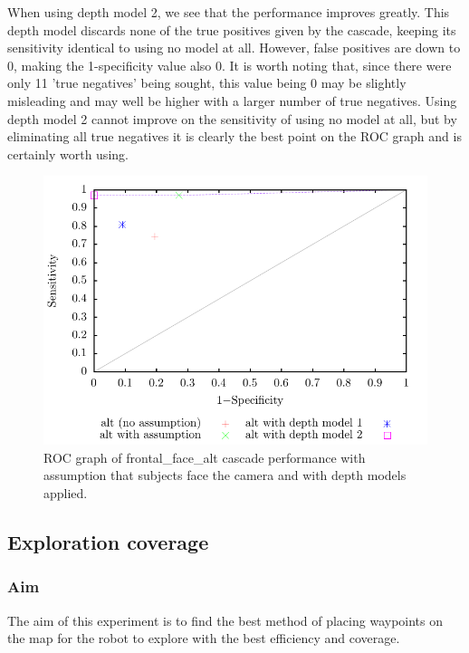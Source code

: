\documentclass[conference]{IEEEtran}
\begin{document}
When using depth model 2, we see that the performance improves greatly. This depth model discards none of the true positives given by the cascade, keeping its sensitivity identical to using no model at all. However, false positives are down to 0, making the 1-specificity value also 0. It is worth noting that, since there were only 11 'true negatives' being sought, this value being 0 may be slightly misleading and may well be higher with a larger number of true negatives. Using depth model 2 cannot improve on the sensitivity of using no model at all, but by eliminating all true negatives it is clearly the best point on the ROC graph and is certainly worth using.

\begin{figure}
  \includegraphics[width=\columnwidth]{kinect_ROC}
  \caption{ROC graph of frontal\_face\_alt cascade performance with assumption that subjects face the camera and with depth models applied.}
  \label{fig:cascade_with_model}
\end{figure}
\subsection{Exploration coverage}
\subsubsection{Aim}
The aim of this experiment is to find the best method of placing waypoints on the map for the robot to explore with the best efficiency and coverage.
\end{document}
